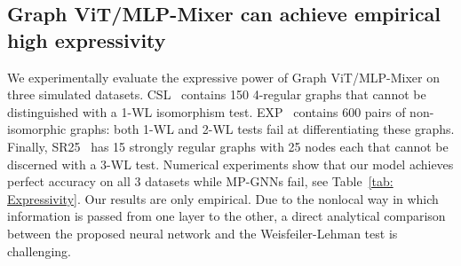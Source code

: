 \documentclass{article}
\begin{document}
\subsection{Graph ViT/MLP-Mixer can achieve empirical high expressivity}

% 

    
We experimentally evaluate the expressive power of Graph ViT/MLP-Mixer on three simulated datasets. CSL~\citep{murphy2019relational} contains 150 4-regular graphs that cannot be distinguished with a 1-WL isomorphism test. EXP~\citep{EXP} contains 600 pairs of non-isomorphic graphs: both 1-WL and 2-WL tests fail at differentiating these graphs. Finally, SR25~\citep{balcilar2021breaking} has 15 strongly regular graphs with 25 nodes each that cannot be discerned with a 3-WL test.  Numerical experiments show that our model 
achieves perfect accuracy on all 3 datasets while MP-GNNs fail, see Table~\ref{tab: Expressivity}. Our results are only empirical. Due to the nonlocal way in which information is passed from one layer to the other, a direct analytical comparison between the proposed neural network and the Weisfeiler-Lehman test is challenging.
\end{document}
